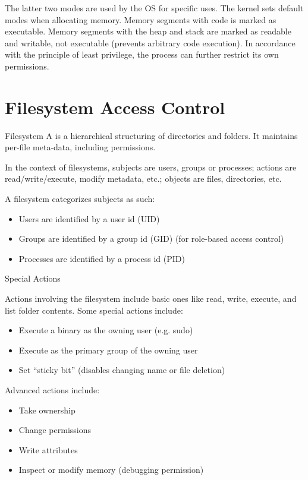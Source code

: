 \documentclass[12pt]{report}
\begin{document}
The latter two modes are used by the OS for specific uses. The kernel sets default modes when allocating memory. Memory segments with code is marked as executable. Memory segments with the heap and stack are marked as readable and writable, not executable (prevents arbitrary code execution). In accordance with the principle of least privilege, the process can further restrict its own permissions.

\section{Filesystem Access Control}

\begin{dfnbox}{Filesystem}{}
    A  is a hierarchical structuring of directories and folders. It maintains per-file meta-data, including permissions.
\end{dfnbox}

In the context of filesystems, subjects are users, groups or processes; actions are read/write/execute, modify metadata, etc.; objects are files, directories, etc.

A filesystem categorizes subjects as such:
\begin{itemize}[noitemsep]
    \item Users are identified by a user id (UID)
    \item Groups are identified by a group id (GID) (for role-based access control)
    \item Processes are identified by a process id (PID)
\end{itemize}

\begin{dfnbox}{Special Actions}{}

\end{dfnbox}

Actions involving the filesystem include basic ones like read, write, execute, and list folder contents. Some special actions include:
\begin{itemize}[noitemsep]
    \item Execute a binary as the owning user (e.g. sudo)
    \item Execute as the primary group of the owning user
    \item Set ``sticky bit'' (disables changing name or file deletion)
\end{itemize}

Advanced actions include:
\begin{itemize}[noitemsep]
    \item Take ownership
    \item Change permissions
    \item Write attributes
    \item Inspect or modify memory (debugging permission)
\end{itemize}
\end{document}
